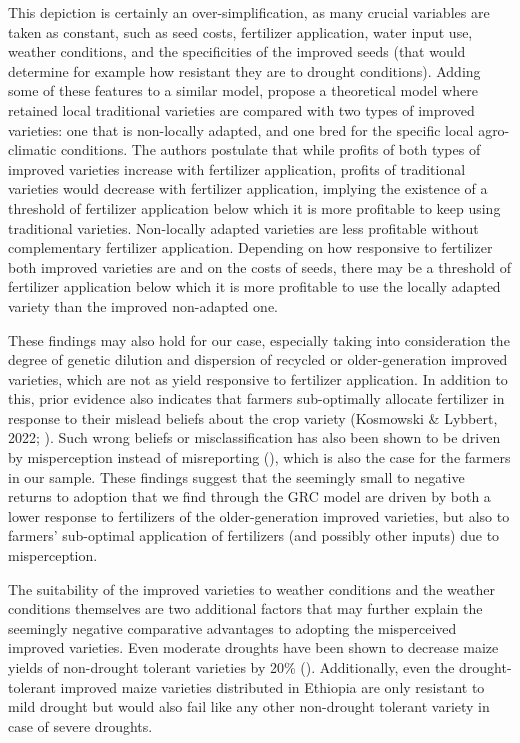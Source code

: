 \documentclass[11pt]{article}
\begin{document}
This depiction is certainly an over-simplification, as many crucial variables are taken as constant, such as seed costs, fertilizer application, water input use, weather conditions, and the specificities of the improved seeds (that would determine for example how resistant they are to drought conditions). Adding some of these features to a similar model, \cite{Bird2020-nt} propose a theoretical model where retained local traditional varieties are compared with two types of improved varieties: one that is non-locally adapted, and one bred for the specific local agro-climatic conditions. The authors postulate that while profits of both types of improved varieties increase with fertilizer application, profits of traditional varieties would decrease with fertilizer application, implying the existence of a threshold of fertilizer application below which it is more profitable to keep using traditional varieties. Non-locally adapted varieties are less profitable without complementary fertilizer application. Depending on how responsive to fertilizer both improved varieties are and on the costs of seeds, there may be a threshold of fertilizer application below which it is more profitable to use the locally adapted variety than the improved non-adapted one.

These findings may also hold for our case, especially taking into consideration the degree of genetic dilution and dispersion of recycled or older-generation improved varieties, which are not as yield responsive to fertilizer application. In addition to this, prior evidence also indicates that farmers sub-optimally allocate fertilizer in response to their mislead beliefs about the crop variety (Kosmowski \& Lybbert, 2022; \citealt{wossen2022misperceiving}). Such wrong beliefs or misclassification has also been shown to be driven by misperception instead of misreporting (\citealt{wossen2022misperceiving}), which is also the case for the farmers in our sample. These findings suggest that the seemingly small to negative returns to adoption that we find through the GRC model are driven by both a lower response to fertilizers of the older-generation improved varieties, but also to farmers’ sub-optimal application of fertilizers (and possibly other inputs) due to misperception.

The suitability of the improved varieties to weather conditions and the weather conditions themselves are two additional factors that may further explain the seemingly negative comparative advantages to adopting the misperceived improved varieties. Even moderate droughts have been shown to decrease maize yields of non-drought tolerant varieties by 20\% (\citealt{paul2021heterogeneous}). Additionally, even the drought-tolerant improved maize varieties distributed in Ethiopia are only resistant to mild drought but would also fail like any other non-drought tolerant variety in case of severe droughts. 
\end{document}
